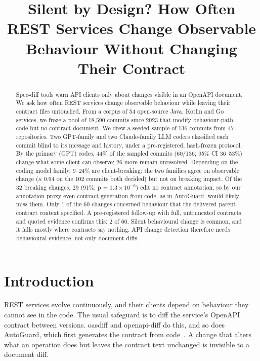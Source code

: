 \documentclass[conference]{IEEEtran}
\begin{document}
\title{Silent by Design? How Often REST Services Change Observable Behaviour Without Changing Their Contract}
\author{}
\maketitle
\begin{abstract}
Spec-diff tools warn API clients only about changes visible in an OpenAPI document. We ask how often REST services change observable behaviour while leaving their contract files untouched. From a corpus of 54 open-source Java, Kotlin and Go services, we froze a pool of 18,590 commits since 2023 that modify behaviour-path code but no contract document. We drew a seeded sample of 136 commits from 47 repositories. Two GPT-family and two Claude-family LLM coders classified each commit blind to its message and history, under a pre-registered, hash-frozen protocol. By the primary (GPT) codes, 44\% of the sampled commits (60/136; 95\% CI 36--53\%) change what some client can observe; 26 more remain unresolved. Depending on the coding model family, 9--24\% are client-breaking: the two families agree on observable change ($\kappa$ 0.94 on the 102 commits both decided) but not on breaking impact. Of the 32 breaking changes, 29 (91\%; p = $1.3 \times 10^{-6}$) edit no contract annotation, so by our annotation proxy even contract generation from code, as in AutoGuard, would likely miss them. Only 1 of the 60 changes concerned behaviour that the delivered parent-contract context specified. A pre-registered follow-up with full, untruncated contracts and quoted evidence confirms this: 2 of 60. Silent behavioural change is common, and it falls mostly where contracts say nothing. API change detection therefore needs behavioural evidence, not only document diffs.
\end{abstract}

\section{Introduction}
REST services evolve continuously, and their clients depend on behaviour they cannot see in the code. The usual safeguard is to diff the service's OpenAPI contract between versions. oasdiff and openapi-diff do this, and so does AutoGuard, which first generates the contract from code~\cite{lercher2025autoguard}. A change that alters what an operation does but leaves the contract text unchanged is invisible to a document diff.
\end{document}
